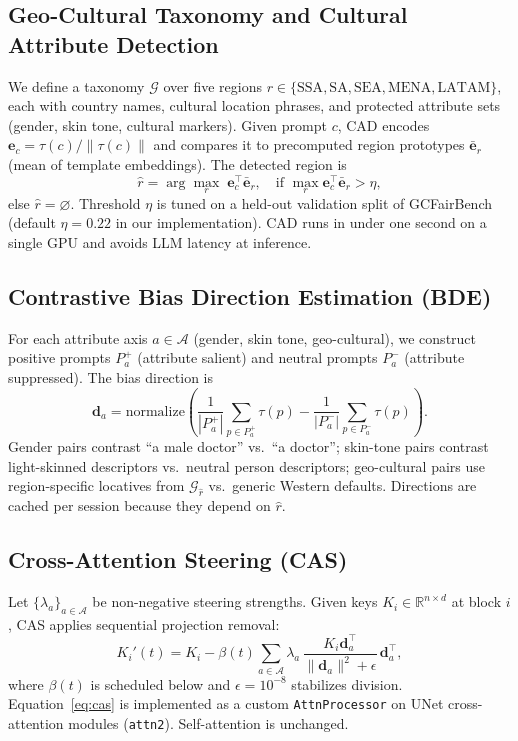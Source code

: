 \documentclass[11pt,a4paper]{article}
\begin{document}
\subsection{Geo-Cultural Taxonomy and Cultural Attribute Detection}
We define a taxonomy $\mathcal{G}$ over five regions $r \in \{\text{SSA}, \text{SA}, \text{SEA}, \text{MENA}, \text{LATAM}\}$, each with country names, cultural location phrases, and protected attribute sets (gender, skin tone, cultural markers). Given prompt $c$, CAD encodes $\mathbf{e}_c = \tau(c)/\|\tau(c)\|$ and compares it to precomputed region prototypes $\bar{\mathbf{e}}_r$ (mean of template embeddings). The detected region is
\begin{equation}
  \hat{r} = \arg\max_r \; \mathbf{e}_c^\top \bar{\mathbf{e}}_r, \quad \text{if } \max_r \mathbf{e}_c^\top \bar{\mathbf{e}}_r > \eta,
  \label{eq:cad}
\end{equation}
else $\hat{r} = \varnothing$. Threshold $\eta$ is tuned on a held-out validation split of GCFairBench (default $\eta=0.22$ in our implementation). CAD runs in under one second on a single GPU and avoids LLM latency at inference.

\subsection{Contrastive Bias Direction Estimation (BDE)}
For each attribute axis $a \in \mathcal{A}$ (gender, skin tone, geo-cultural), we construct positive prompts $P_a^+$ (attribute salient) and neutral prompts $P_a^-$ (attribute suppressed). The bias direction is
\begin{equation}
  \mathbf{d}_a = \mathrm{normalize}\!\left(
    \frac{1}{|P_a^+|}\sum_{p \in P_a^+} \tau(p)
    - \frac{1}{|P_a^-|}\sum_{p \in P_a^-} \tau(p)
  \right).
  \label{eq:bde}
\end{equation}
Gender pairs contrast ``a male doctor'' vs.\ ``a doctor''; skin-tone pairs contrast light-skinned descriptors vs.\ neutral person descriptors; geo-cultural pairs use region-specific locatives from $\mathcal{G}_{\hat{r}}$ vs.\ generic Western defaults. Directions are cached per session because they depend on $\hat{r}$.

\subsection{Cross-Attention Steering (CAS)}
Let $\{\lambda_a\}_{a \in \mathcal{A}}$ be non-negative steering strengths. Given keys $K_i \in \mathbb{R}^{n \times d}$ at block $i$, CAS applies sequential projection removal:
\begin{equation}
  K_i'(t) = K_i - \beta(t) \sum_{a \in \mathcal{A}} \lambda_a \,
  \frac{K_i \mathbf{d}_a^\top}{\|\mathbf{d}_a\|^2 + \epsilon} \, \mathbf{d}_a^\top,
  \label{eq:cas}
\end{equation}
where $\beta(t)$ is scheduled below and $\epsilon=10^{-8}$ stabilizes division. Equation~\eqref{eq:cas} is implemented as a custom \texttt{AttnProcessor} on UNet cross-attention modules (\texttt{attn2}). Self-attention is unchanged.
\end{document}
